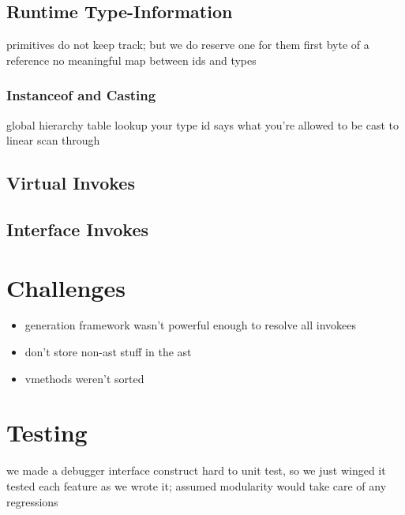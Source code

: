 \documentclass{article}
\begin{document}
\subsection{Runtime Type-Information}
primitives do not keep track; but we do reserve one for them
first byte of a reference
no meaningful map between ids and types


\subsubsection{Instanceof and Casting}
global hierarchy table
lookup your type id
says what you're allowed to be cast to
linear scan through


\subsection{Virtual Invokes}

\subsection{Interface Invokes}






\section{Challenges}
\begin{itemize}
    \item generation framework wasn't powerful enough to resolve all invokees
    \item don't store non-ast stuff in the ast
    \item vmethods weren't sorted
\end{itemize}




\section{Testing}

we made a debugger interface construct
hard to unit test, so we just winged it
tested each feature as we wrote it; assumed modularity would take care of any regressions

\testsrc{*}
\end{document}
